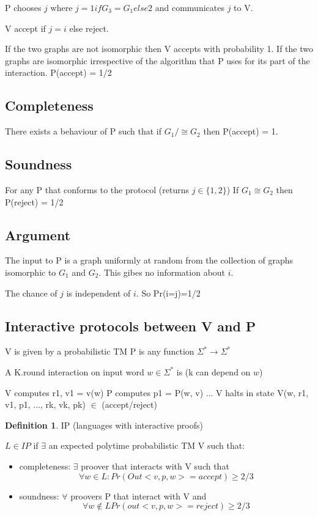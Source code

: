 \documentclass[a4paper,12pt]{article}
\theoremstyle{definition}
\newtheorem{definition}[counter]{Definition}
\theoremstyle{remark}
\begin{document}
P chooses $j$ where $j = 1 if G_3 = G_1 else 2$ and communicates $j$ to V.

V accept if $j = i$ else reject.

If the two graphs are not isomorphic then V accepts with probability 1.
If the two graphs are isomorphic
irrespective of the algorithm that P uses for its part of the interaction.
P(accept) = 1/2

\subsection*{Completeness}
There exists a behaviour of P such that if $G_1 /\cong G_2$ then P(accept) = 1.

\subsection*{Soundness}
For any P that conforms to the protocol (returns $j \in \{1, 2\}$)
If $G_1 \cong G_2$ then P(reject) = 1/2

\subsection*{Argument}
The input to P is a graph uniformly at random from the collection of graphs isomorphic to $G_1$ and $G_2$.
This gibes no information about $i$.

The chance of $j$ is independent of $i$.
So Pr(i=j)=1/2

\subsection{Interactive protocols between V and P}
V is given by a probabilistic TM
P is any function $\Sigma^* \to \Sigma^*$

A K.round interaction on input word $w \in \Sigma^*$ is (k can depend on $w$)

V computes r1, v1 = v(w)
P computes p1 = P(w, v)
...
V halts in state V(w, r1, v1, p1, ..., rk, vk, pk) $\in$ (accept/reject)

\begin{definition}
    IP (languages with interactive proofs)

    $L \in IP $ if $\exists$ an expected polytime probabilistic TM V such that:
    \begin{itemize}
        \item completeness:
        $\exists$ proover that interacts with V such that
        \begin{equation*}
            \forall w \in L: Pr(Out<v,p,w>=accept) \geq 2/3
        \end{equation*}
        \item soundness:
        $\forall$ proovers P that interact with V and
        \begin{equation*}
            \forall w \notin L Pr(out<v,p,w>=reject) \geq 2/3
        \end{equation*}
    \end{itemize}

\end{definition}
\end{document}

